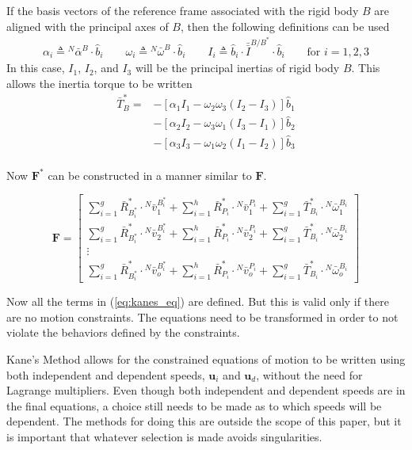 \documentclass[smallcondensed,final]{svjour3}                     %
\begin{document}
If the basis vectors of the reference frame associated with the rigid body $B$
are aligned with the principal axes of $B$, then the following definitions can
be used
\begin{align}
\alpha_i \triangleq {^N}\bar{\alpha}^B \cdot \hat{b}_i \quad \quad
\omega_i \triangleq {^N}\bar{\omega}^B \cdot \hat{b}_i \quad \quad
I_i \triangleq \hat{b}_i \cdot \bar{\bar{I}}^{B/B^*} \cdot \hat{b}_i
\quad \quad \text{for }i=1,2,3
\end{align}
In this case, $I_1$, $I_2$, and $I_3$ will be the principal inertias of rigid
body $B$.
This allows the inertia torque to be written
\begin{align}
\label{eq:simple_rb_rotational_gen_inertia}
\bar{T}_B^* =& -[\alpha_1 I_1 - \omega_2 \omega_3 (I_2 - I_3)] \hat{b}_1\\
             & -[\alpha_2 I_2 - \omega_3 \omega_1 (I_3 - I_1)] \hat{b}_2\\
             & -[\alpha_3 I_3 - \omega_1 \omega_2 (I_1 - I_2)] \hat{b}_3\\
\end{align}

Now $\mathbf{F}^*$ can be constructed in a manner similar to $\mathbf{F}$.

\begin{equation}
\label{eq:definition_Fstar}
\mathbf{F} =
\begin{bmatrix}
\displaystyle \sum_{i=1}^g \bar{R}^*_{B^*_i} \cdot {^N}\bar{v}^{B^*_i}_1 +
\sum_{i=1}^h \bar{R}^*_{P_i} \cdot {^N}\bar{v}^{P_i}_1 +
\sum_{i=1}^g \bar{T}^*_{B_i} \cdot {^N}\bar{\omega}^{B_i}_1 \\
\displaystyle \sum_{i=1}^g \bar{R}^*_{B^*_i} \cdot {^N}\bar{v}^{B^*_i}_2 +
\sum_{i=1}^h \bar{R}^*_{P_i} \cdot {^N}\bar{v}^{P_i}_2 +
\sum_{i=1}^g \bar{T}^*_{B_i} \cdot {^N}\bar{\omega}^{B_i}_2 \\
\displaystyle \vdots \\
\displaystyle \sum_{i=1}^g \bar{R}^*_{B^*_i} \cdot {^N}\bar{v}^{B^*_i}_o +
\sum_{i=1}^h \bar{R}^*_{P_i} \cdot {^N}\bar{v}^{P_i}_o +
\sum_{i=1}^g \bar{T}^*_{B_i} \cdot {^N}\bar{\omega}^{B_i}_o
\end{bmatrix}
\end{equation}

Now all the terms in (\ref{eq:kanes_eq}) are defined.
But this is valid only if there are no motion constraints.
The equations need to be transformed in order to not violate the behaviors
defined by the constraints.

Kane's Method allows for the constrained equations of motion to be written
using both independent and dependent speeds, $\mathbf{u}_i$ and $\mathbf{u}_d$,
without the need for Lagrange multipliers.
Even though both independent and dependent speeds are in the final equations, a
choice still needs to be made as to which speeds will be dependent.
The methods for doing this are outside the scope of this paper, but it is
important that whatever selection is made avoids singularities.
\end{document}

